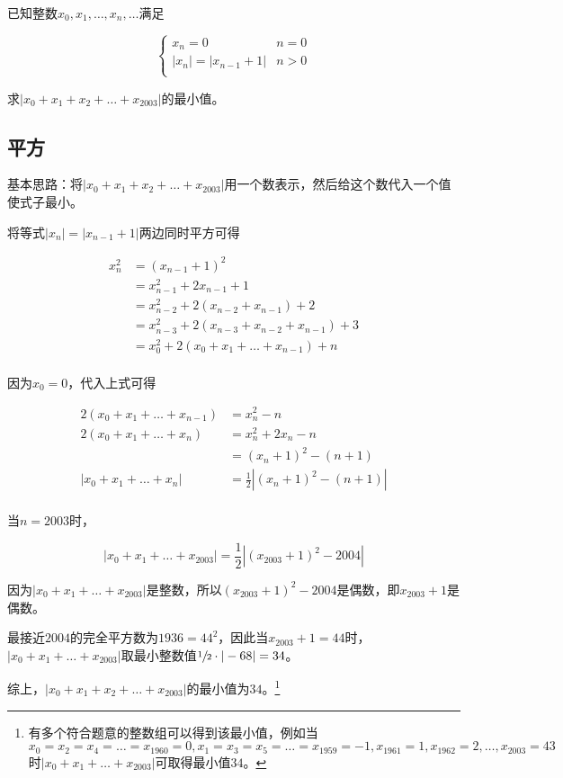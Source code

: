 

已知整数$x_0, x_1, \dots, x_n, \dots$满足

\[ \begin{cases}
  x_n = 0 & n = 0 \\
  |x_n| = |x_{n - 1} + 1| & n > 0 \\
\end{cases} \]

求$|x_0 + x_1 + x_2 + \dots + x_{2003}|$的最小值。


\subsection{平方}

基本思路：将$|x_0 + x_1 + x_2 + \dots + x_{2003}|$用一个数表示，然后给这个数代入一个值使式子最小。

将等式$|x_n| = |x_{n - 1} + 1|$两边同时平方可得

\begin{align*}
  x_n^2 &= (x_{n - 1} + 1)^2 \\
  &= x_{n - 1}^2 + 2x_{n - 1} + 1 \\
  &= x_{n - 2}^2 + 2(x_{n - 2} + x_{n - 1}) + 2 \\
  &= x_{n - 3}^2 + 2(x_{n - 3} + x_{n - 2} + x_{n - 1}) + 3 \\
  &= x_0^2 + 2(x_0 + x_1 + \dots + x_{n - 1}) + n \\
\end{align*}

因为$x_0 = 0$，代入上式可得

\begin{align*}
  2(x_0 + x_1 + \dots + x_{n - 1}) &= x_n^2 - n \\
  2(x_0 + x_1 + \dots + x_n) &= x_n^2 + 2x_n - n \\
  &= (x_n + 1)^2 - (n + 1) \\
  |x_0 + x_1 + \dots + x_n| &= \frac12|(x_n + 1)^2 - (n + 1)| \\
\end{align*}

当$n = 2003$时，

\[ |x_0 + x_1 + \dots + x_{2003}| = \frac12|(x_{2003} + 1)^2 - 2004| \]

因为$|x_0 + x_1 + \dots + x_{2003}|$是整数，所以$(x_{2003} + 1)^2 - 2004$是偶数，即$x_{2003} + 1$是偶数。

最接近$2004$的完全平方数为$1936 = 44^2$，因此当$x_{2003} + 1 = 44$时，$|x_0 + x_1 + \dots + x_{2003}|$取最小整数值$\sfrac12\cdot|-68| = 34$。

综上，$|x_0 + x_1 + x_2 + \dots + x_{2003}|$的最小值为$34$。\footnote{有多个符合题意的整数组可以得到该最小值，例如当$x_0 = x_2 = x_4 = \dots = x_{1960} = 0, x_1 = x_3 = x_5 = \dots = x_{1959} = -1, x_{1961} = 1, x_{1962} = 2, \dots, x_{2003} = 43$时$|x_0 + x_1 + \dots + x_{2003}|$可取得最小值$34$。}
